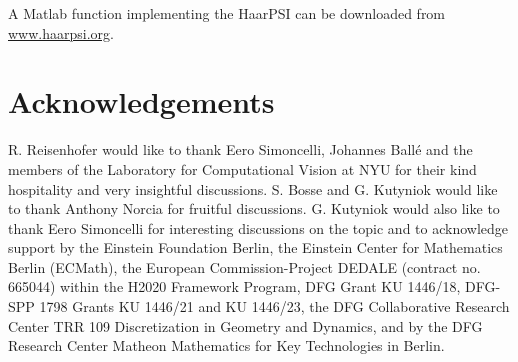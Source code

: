 \documentclass[11pt,a4paper]{article}
\begin{document}
A Matlab function implementing the HaarPSI can be downloaded from \url{www.haarpsi.org}.
\FloatBarrier
\section*{Acknowledgements}
{R. Reisenhofer would like to thank Eero Simoncelli, Johannes Ball\'{e} and the members of the Laboratory for Computational Vision at NYU for their kind hospitality and very insightful discussions. S. Bosse and G. Kutyniok would like to thank Anthony Norcia for fruitful discussions. G. Kutyniok would also like to thank Eero Simoncelli for interesting discussions on the topic and to acknowledge support by the Einstein Foundation Berlin, the Einstein Center for Mathematics Berlin (ECMath), the European Commission-Project DEDALE (contract no. 665044) within the H2020 Framework Program, DFG Grant KU 1446/18, DFG-SPP 1798 Grants KU 1446/21 and KU 1446/23, the DFG Collaborative Research Center TRR 109 Discretization in Geometry and Dynamics, and by the DFG Research Center Matheon Mathematics for Key Technologies in Berlin.}




\clearpage

\appendix
\end{document}
